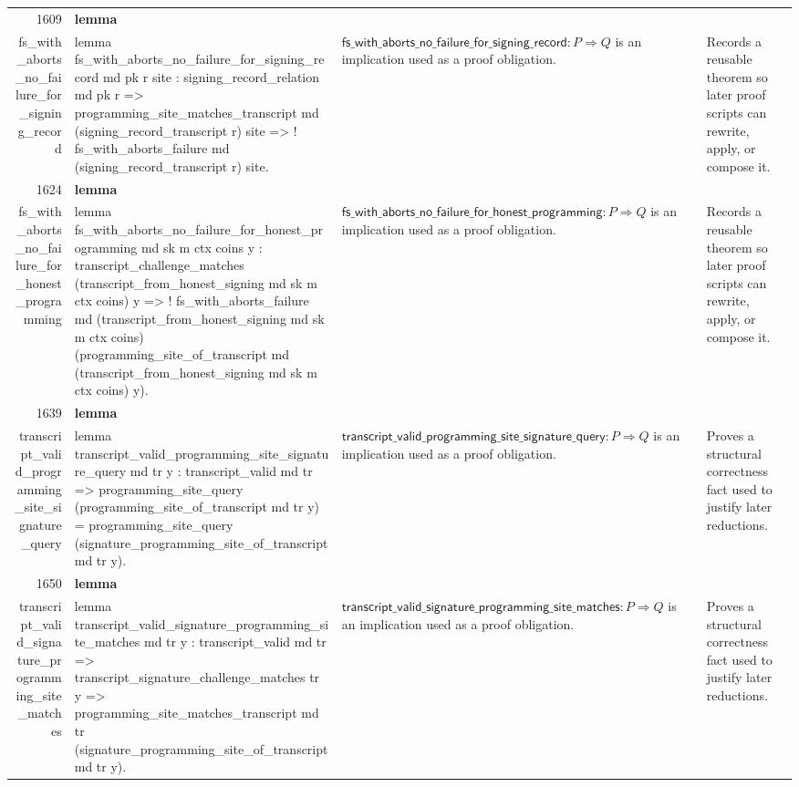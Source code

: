 \documentclass[10pt]{article}
\newcommand{\ec}[1]{\begingroup\ttfamily\scriptsize #1\endgroup}
\begin{document}
\begin{longtable}{r L{0.17\textwidth} L{0.26\textwidth} L{0.27\textwidth} L{0.20\textwidth}}
1609 & \textbf{lemma}\\\ec{fs\_with\_aborts\_no\_failure\_for\_signing\_record} & \ec{lemma fs\_with\_aborts\_no\_failure\_for\_signing\_record md pk r site : signing\_record\_relation md pk r => programming\_site\_matches\_transcript md (signing\_record\_transcript r) site => ! fs\_with\_aborts\_failure md (signing\_record\_transcript r) site.} & \(\mathsf{fs\_with\_aborts\_no\_failure\_for\_signing\_record} : P \Rightarrow Q\) is an implication used as a proof obligation. & Records a reusable theorem so later proof scripts can rewrite, apply, or compose it. \\
1624 & \textbf{lemma}\\\ec{fs\_with\_aborts\_no\_failure\_for\_honest\_programming} & \ec{lemma fs\_with\_aborts\_no\_failure\_for\_honest\_programming md sk m ctx coins y : transcript\_challenge\_matches (transcript\_from\_honest\_signing md sk m ctx coins) y => ! fs\_with\_aborts\_failure md (transcript\_from\_honest\_signing md sk m ctx coins) (programming\_site\_of\_transcript md (transcript\_from\_honest\_signing md sk m ctx coins) y).} & \(\mathsf{fs\_with\_aborts\_no\_failure\_for\_honest\_programming} : P \Rightarrow Q\) is an implication used as a proof obligation. & Records a reusable theorem so later proof scripts can rewrite, apply, or compose it. \\
1639 & \textbf{lemma}\\\ec{transcript\_valid\_programming\_site\_signature\_query} & \ec{lemma transcript\_valid\_programming\_site\_signature\_query md tr y : transcript\_valid md tr => programming\_site\_query (programming\_site\_of\_transcript md tr y) = programming\_site\_query (signature\_programming\_site\_of\_transcript md tr y).} & \(\mathsf{transcript\_valid\_programming\_site\_signature\_query} : P \Rightarrow Q\) is an implication used as a proof obligation. & Proves a structural correctness fact used to justify later reductions. \\
1650 & \textbf{lemma}\\\ec{transcript\_valid\_signature\_programming\_site\_matches} & \ec{lemma transcript\_valid\_signature\_programming\_site\_matches md tr y : transcript\_valid md tr => transcript\_signature\_challenge\_matches tr y => programming\_site\_matches\_transcript md tr (signature\_programming\_site\_of\_transcript md tr y).} & \(\mathsf{transcript\_valid\_signature\_programming\_site\_matches} : P \Rightarrow Q\) is an implication used as a proof obligation. & Proves a structural correctness fact used to justify later reductions. \\

\end{longtable}
\end{document}
